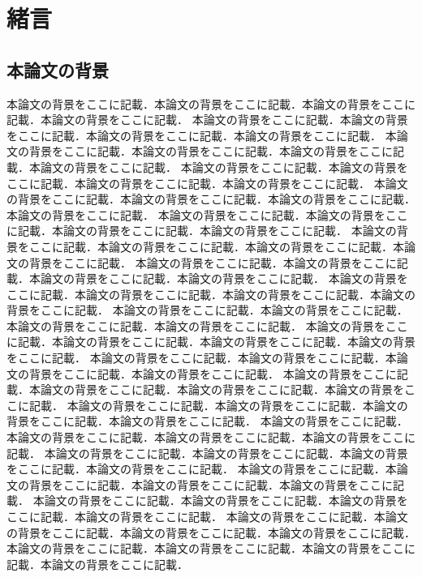 \chapter{緒言}
\label{chap:intro}

\section{本論文の背景}
本論文の背景をここに記載．本論文の背景をここに記載．本論文の背景をここに記載．本論文の背景をここに記載．
本論文の背景をここに記載．本論文の背景をここに記載．本論文の背景をここに記載．本論文の背景をここに記載．
本論文の背景をここに記載．本論文の背景をここに記載．本論文の背景をここに記載．本論文の背景をここに記載．
本論文の背景をここに記載．本論文の背景をここに記載．本論文の背景をここに記載．本論文の背景をここに記載．
本論文の背景をここに記載．本論文の背景をここに記載．本論文の背景をここに記載．本論文の背景をここに記載．
本論文の背景をここに記載．本論文の背景をここに記載．本論文の背景をここに記載．本論文の背景をここに記載．
本論文の背景をここに記載．本論文の背景をここに記載．本論文の背景をここに記載．本論文の背景をここに記載．
本論文の背景をここに記載．本論文の背景をここに記載．本論文の背景をここに記載．本論文の背景をここに記載．
本論文の背景をここに記載．本論文の背景をここに記載．本論文の背景をここに記載．本論文の背景をここに記載．
本論文の背景をここに記載．本論文の背景をここに記載．本論文の背景をここに記載．本論文の背景をここに記載．
本論文の背景をここに記載．本論文の背景をここに記載．本論文の背景をここに記載．本論文の背景をここに記載．
本論文の背景をここに記載．本論文の背景をここに記載．本論文の背景をここに記載．本論文の背景をここに記載．
本論文の背景をここに記載．本論文の背景をここに記載．本論文の背景をここに記載．本論文の背景をここに記載．
本論文の背景をここに記載．本論文の背景をここに記載．本論文の背景をここに記載．本論文の背景をここに記載．
本論文の背景をここに記載．本論文の背景をここに記載．本論文の背景をここに記載．本論文の背景をここに記載．
本論文の背景をここに記載．本論文の背景をここに記載．本論文の背景をここに記載．本論文の背景をここに記載．
本論文の背景をここに記載．本論文の背景をここに記載．本論文の背景をここに記載．本論文の背景をここに記載．
本論文の背景をここに記載．本論文の背景をここに記載．本論文の背景をここに記載．本論文の背景をここに記載．
本論文の背景をここに記載．本論文の背景をここに記載．本論文の背景をここに記載．本論文の背景をここに記載．
本論文の背景をここに記載．本論文の背景をここに記載．本論文の背景をここに記載．本論文の背景をここに記載．
